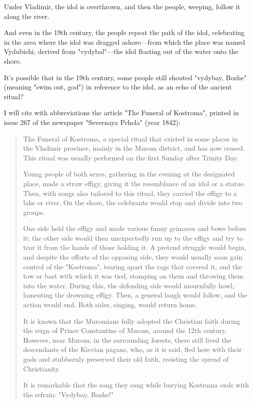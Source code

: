 \documentclass[a5paper,11pt,openany]{article}
\begin{document}
Under Vladimir, the idol is overthrown, and then the people, weeping, follow it along the river.

And even in the 19th century, the people repeat the path of the idol, celebrating in the area where the idol was dragged ashore—from which the place was named Vydubichi, derived from "vydybal"—the idol floating out of the water onto the shore.

It’s possible that in the 19th century, some people still shouted "vydybay, Bozhe" (meaning "swim out, god") in reference to the idol, as an echo of the ancient ritual?

I will cite with abbreviations the article "The Funeral of Kostroma", printed in issue 267 of the newspaper "Severnaya Pchela" (year 1842):

\begin{quotation}
\noindent The Funeral of Kostroma, a special ritual that existed in some places in the Vladimir province, mainly in the Murom district, and has now ceased. This ritual was usually performed on the first Sunday after Trinity Day.  

Young people of both sexes, gathering in the evening at the designated place, made a straw effigy, giving it the resemblance of an idol or a statue. Then, with songs also tailored to this ritual, they carried the effigy to a lake or river. On the shore, the celebrants would stop and divide into two groups.

One side held the effigy and made various funny grimaces and bows before it; the other side would then unexpectedly run up to the effigy and try to tear it from the hands of those holding it. A pretend struggle would begin, and despite the efforts of the opposing side, they would usually soon gain control of the "Kostroma", tearing apart the rags that covered it, and the tow or bast with which it was tied, stomping on them and throwing them into the water. During this, the defending side would mournfully howl, lamenting the drowning effigy. Then, a general laugh would follow, and the action would end. Both sides, singing, would return home.

It is known that the Muromians fully adopt\-ed the Christian faith during the reign of Prince Constantine of Murom, around the 12th century. However, near Murom, in the surrounding forests, there still lived the descendants of the Kievian pagans, who, as it is said, fled here with their gods and stubbornly preserved their old faith, resisting the spread of Christianity.

It is remarkable that the song they sang while burying Kostrama ends with the refrain: "Vydybay, Bozhe!"
\end{quotation}
\end{document}
